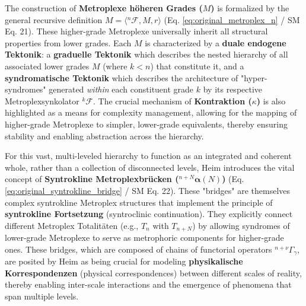 \documentclass[12pt]{article}
\def\metroplex#1#2{M}%
\newcommand{\hypermetrophor}[1]{%
  \metroplex{#1}{a}%
}
\newcommand{\metroplexsynkolator}[1]{{}^{#1}\mathcal{F}}
\newcommand{\metroplextotalitaet}[1]{T_{#1}}
\newcommand{\syntroklinebruecke}[1]{{}^{#1}\bm{\alpha}}
\begin{document}
The construction of \textbf{Metroplexe höheren Grades (\( \metroplex{n}{} \))} is formalized by the general recursive definition \( \metroplex{n}{} = \langle \metroplexsynkolator{n}{}, \hypermetrophor{n-1}{}, r \rangle \) (Eq. \eqref{eq:original_metroplex_n} / SM Eq. 21). These higher-grade Metroplexe universally inherit all structural properties from lower grades. Each \( \metroplex{n}{} \) is characterized by a \textbf{duale endogene Tektonik}: a \textbf{graduelle Tektonik} which describes the nested hierarchy of all associated lower grades \( \metroplex{k}{} \) (where \( k<n \)) that constitute it, and a \textbf{syndromatische Tektonik} which describes the architecture of "hyper-syndromes" generated \textit{within} each constituent grade \(k\) by its respective Metroplexsynkolator \( \metroplexsynkolator{k}{} \). The crucial mechanism of \textbf{Kontraktion (\( \kappa \))} is also highlighted as a means for complexity management, allowing for the mapping of higher-grade Metroplexe to simpler, lower-grade equivalents, thereby ensuring stability and enabling abstraction across the hierarchy.

For this vast, multi-leveled hierarchy to function as an integrated and coherent whole, rather than a collection of disconnected levels, Heim introduces the vital concept of \textbf{Syntrokline Metroplexbrücken (\( \syntroklinebruecke{n+N}(N) \))} (Eq. \eqref{eq:original_syntrokline_bridge} / SM Eq. 22). These "bridges" are themselves complex syntrokline Metroplex structures that implement the principle of \textbf{syntrokline Fortsetzung} (syntroclinic continuation). They explicitly connect different Metroplex Totalitäten (e.g., \( \metroplextotalitaet{n} \) with \( \metroplextotalitaet{n+N} \)) by allowing syndromes of lower-grade Metroplexe to serve as metrophoric components for higher-grade ones. These bridges, which are composed of chains of functorial operators \( {}^{n+\nu}\Gamma_\gamma \), are posited by Heim as being crucial for modeling \textbf{physikalische Korrespondenzen} (physical correspondences) between different scales of reality, thereby enabling inter-scale interactions and the emergence of phenomena that span multiple levels.
\end{document}
